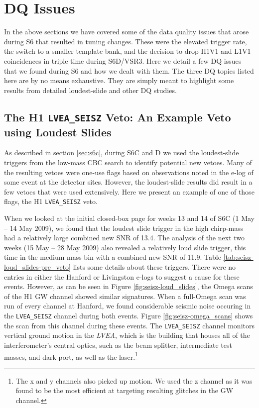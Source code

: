 \section{DQ Issues}

In the above sections we have covered some of the data quality issues that arose during S6 that resulted in tuning changes. These were the elevated trigger rate, the switch to a smaller template bank, and the decision to drop H1V1 and L1V1 coincidences in triple time during S6D/VSR3. Here we detail a few \ac{DQ} issues that we found during \ac{S6} and how we dealt with them. The three \ac{DQ} topics listed here are by no means exhaustive. They are simply meant to highlight some results from detailed loudest-slide and other DQ studies.

\subsection{The H1 \texttt{LVEA\_SEISZ} Veto: An Example Veto using Loudest Slides}

As described in section \ref{sec:s6c}, during S6C and D we used the loudest-slide triggers from the low-mass \ac{CBC} search to identify potential new vetoes. Many of the resulting vetoes were one-use flags based on observations noted in the e-log of some event at the detector sites. However, the loudest-slide results did result in a few vetoes that were used extensively. Here we present an example of one of those flags, the H1 \verb|LVEA_SEISZ| veto.

When we looked at the initial closed-box \ihope page for weeks 13 and 14 of S6C (1 May -- 14 May 2009), we found that the loudest slide trigger in the high chirp-mass had a relatively large combined new \ac{SNR} of 13.4. The \ihope analysis of the next two weeks (15 May -- 28 May 2009) also revealed a relatively loud slide trigger, this time in the medium mass bin with a combined new \ac{SNR} of 11.9. Table \ref{tab:seisz-loud_slides-pre_veto} lists some details about these triggers. There were no entries in either the Hanford or Livingston e-logs to suggest a cause for these events. However, as can be seen in Figure \ref{fig:seisz-loud_slides}, the Omega scans of the H1 \ac{GW} channel showed similar signatures. When a full-Omega scan was run of every channel at Hanford, we found considerable seismic noise occuring in the \verb|LVEA_SEISZ| channel during both events. Figure \ref{fig:seisz-omega_scans} shows the scan from this channel during these events. The \verb|LVEA_SEISZ| channel monitors vertical ground motion in the \emph{LVEA}, which is the building that houses all of the interferometer's central optics, such as the beam splitter, intermediate test masses, and dark port, as well as the laser.\footnote{The x and y channels also picked up motion. We used the z channel as it was found to be the most efficient at targeting resulting glitches in the \ac{GW} channel.}

